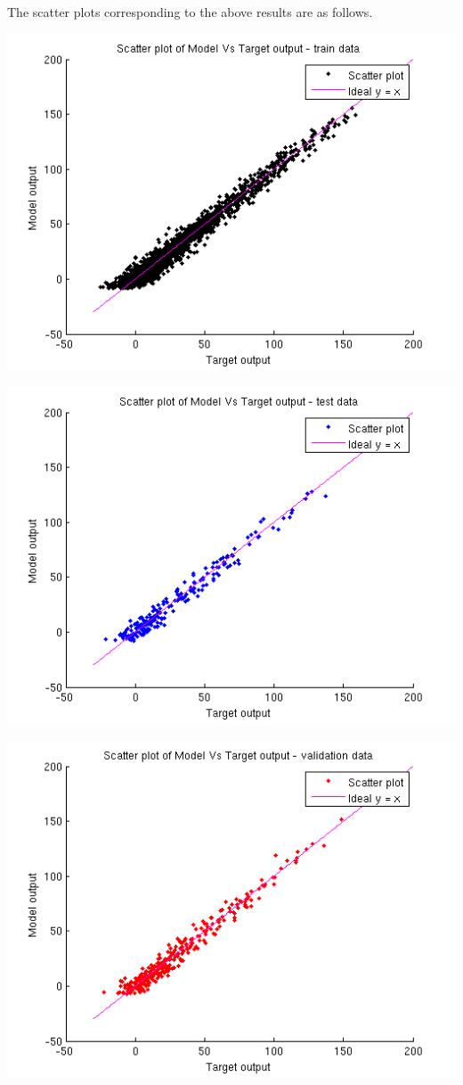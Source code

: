 \documentclass{article}
\begin{document}
The scatter plots corresponding to the above results are as follows.
\begin{center}
\includegraphics[scale=.6]{Regression/bivar/eps/scatter_train}
\end{center}
\begin{center}
\includegraphics[scale=.6]{Regression/bivar/eps/scatter_test}
\end{center}
\begin{center}
\includegraphics[scale=.6]{Regression/bivar/eps/scatter_val}
\end{center}
\end{document}
